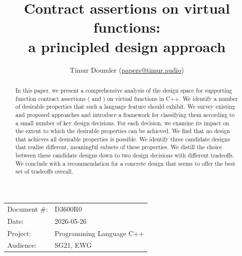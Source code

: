 \newcommand{\propref}[1]{\hyperref[#1]{\tcode{#1}}}



\title{Contract assertions on virtual functions: \\ a principled design approach}
\author{
Timur Doumler \small(\href{mailto:papers@timur.audio}{papers@timur.audio}) 
}
\date{}
\maketitle

\begin{tabular}{ll}
Document \#: & D3600R0 \\
Date: &2026-05-26 \\
Project: & Programming Language C++ \\
Audience: & SG21, EWG
\end{tabular}

\begin{abstract}
In this paper, we present a comprehensive analysis of the design space for supporting function contract assertions ( and ) on virtual functions in C++. We identify a number of desirable properties that such a language feature should exhibit. We survey existing and proposed approaches and introduce a framework for classifying them according to a small number of key design decisions. For each decision, we examine its impact on the extent to which the desirable properties can be achieved. We find that no design that achieves all desirable properties is possible. We identify three candidate designs that realise different, meaningful subsets of these properties. We distill the choice between these candidate designs down to two design decisions with different tradeoffs. We conclude with a recommendation for a concrete design that seems to offer the best set of tradeoffs overall.
\end{abstract}


\pagebreak
\tableofcontents*
\pagebreak




